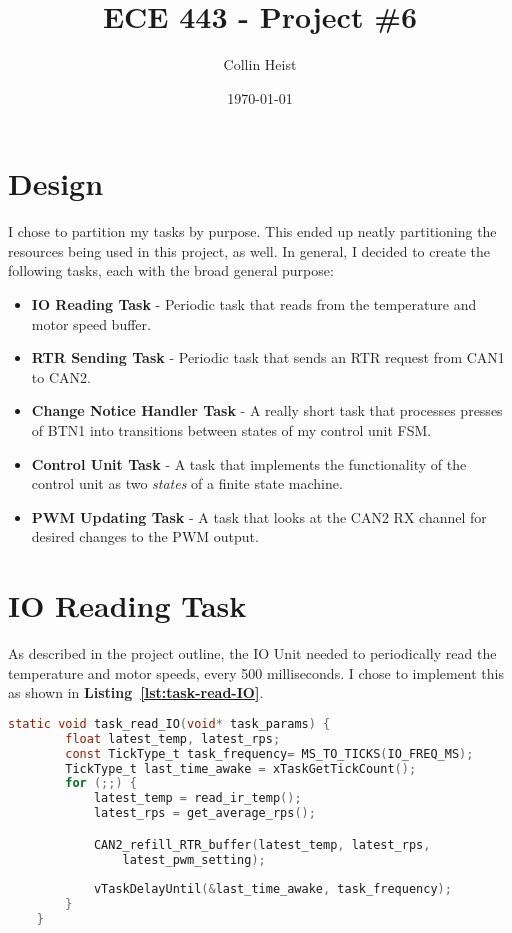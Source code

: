 \documentclass[a4paper, 12pt]{article}
\begin{document}
\title{ECE 443 - Project \#6}
\author{Collin Heist}
\date{\today}
\maketitle

\tableofcontents
\newpage
{}

\section{Design}
\label{sec:design}

I chose to partition my tasks by purpose. This ended up neatly partitioning the resources being used in this project, as well. In general, I decided to create the following tasks, each with the broad general purpose:

\begin{itemize}
\item \textbf{IO Reading Task} - Periodic task that reads from the temperature and motor speed buffer.
\item \textbf{RTR Sending Task} - Periodic task that sends an RTR request from CAN1 to CAN2.
\item \textbf{Change Notice Handler Task} - A really short task that processes presses of BTN1 into transitions between states of my control unit FSM.
\item \textbf{Control Unit Task} - A task that implements the functionality of the control unit as two \emph{states} of a finite state machine.
\item \textbf{PWM Updating Task} - A task that looks at the CAN2 RX channel for desired changes to the PWM output.
\end{itemize}

\section{IO Reading Task}
As described in the project outline, the IO Unit needed to periodically read the temperature and motor speeds, every 500 milliseconds. I chose to implement this as shown in \textbf{Listing~\ref{lst:task-read-IO}}.

	\begin{mdframed}[backgroundcolor=code-gray, roundcorner=10pt,
								innerleftmargin=5, innertopmargin=5, innerbottommargin=5]	
	\begin{lstlisting}[language=C, caption=IO Reading Task, tabsize=2, label={lst:task-read-IO}]
	static void task_read_IO(void* task_params) {
		float latest_temp, latest_rps;
		const TickType_t task_frequency= MS_TO_TICKS(IO_FREQ_MS);
		TickType_t last_time_awake = xTaskGetTickCount();
		for (;;) {
			latest_temp = read_ir_temp();
			latest_rps = get_average_rps();

			CAN2_refill_RTR_buffer(latest_temp, latest_rps,
				latest_pwm_setting);
		
			vTaskDelayUntil(&last_time_awake, task_frequency);
		}
	}
	\end{lstlisting}
	\end{mdframed}
	
\end{document}
